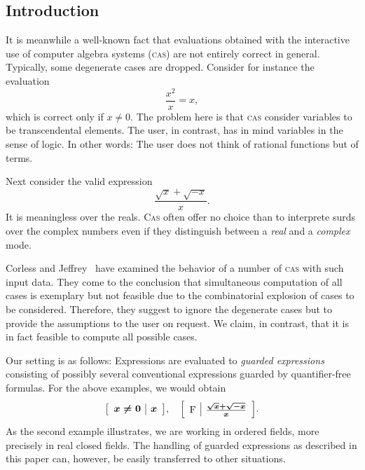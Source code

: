 
\newenvironment{gex}{\left[\begin{array}{c|c}}{\end{array}\right]}
\newcommand{\gc}[1]{\mbox{\boldmath$#1$}}
\newcommand{\true}{\textrm{T}}
\newcommand{\false}{\textrm{F}}
\newcommand{\E}{\textrm{E}}
\newcommand{\GE}{\textrm{GE}}
\newcommand{\gscheme}{\textrm{gscheme}}
\newcommand{\sign}{\textrm{sign}}

\subsection{Introduction}
It is meanwhile a well-known fact that evaluations obtained with the
interactive use of computer algebra systems (\textsc{cas}) are not
entirely correct in general. Typically, some degenerate cases are
dropped. Consider for instance the evaluation
$$
\frac{x^2}{x}=x,
$$
which is correct only if $x\neq0$.
The problem here is that \textsc{cas} consider variables to be
transcendental elements. The user, in contrast, has in mind variables
in the sense of logic. In other words: The user does not think of
rational functions but of terms.

Next consider the valid expression
$$
\frac{\sqrt{x}+\sqrt{-x}}{x}.
$$
It is meaningless over the reals. \textsc{Cas} often offer no choice than
to interprete surds over the complex numbers even if they distinguish
between a {\em real} and a {\em complex} mode.

Corless and Jeffrey~\cite{CorlessJeffrey:92} have examined the
behavior of a number of \textsc{cas} with such input data. They come to
the conclusion that simultaneous computation of all cases is exemplary
but not feasible due to the combinatorial explosion of cases to be
considered. Therefore, they suggest to ignore the degenerate cases but
to provide the assumptions to the user on request. We claim, in
contrast, that it is in fact feasible to compute all possible cases.

Our setting is as follows: Expressions are evaluated to {\em guarded
expressions} consisting of possibly several conventional expressions
guarded by quantifier-free formulas. For the above examples, we would
obtain
$$
\begin{gex}
\gc{x\neq0}&\gc{x}
\end{gex},\quad
\begin{gex}
\gc{\false}&\gc{\frac{\sqrt{x}+\sqrt{-x}}{x}}
\end{gex}.
$$
As the second example illustrates, we are working in ordered fields,
more precisely in real closed fields. The handling of guarded
expressions as described in this paper can, however, be easily
transferred to other situations.

